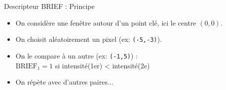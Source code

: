 \begin{frame}{Descripteur BRIEF : Principe}
\begin{minipage}{0.45\linewidth}
\vspace{1em}
\end{minipage}
\vspace{1em}

\begin{itemize}
  \item<1-> On considère une fenêtre autour d’un point clé, ici le centre $(0,0)$.
  \item<2-> On choisit aléatoirement un pixel (ex: \texttt{(-5,-3)}).
  \item<3-> On le compare à un autre (ex: \texttt{(-1,5)}) :\\
           $\text{BRIEF}_1 = 1$ si intensité(1er) < intensité(2e)
  \item<4-> On répète avec d'autres paires...
\end{itemize}
\end{frame}


